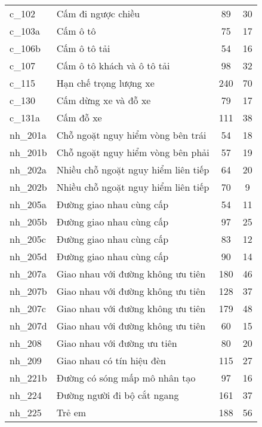 \documentclass[../thesis.tex]{subfiles}
\begin{document}
\begin{table}[H]
\begin{longtable}{| l | l | c | c |}
	\hline
	\thead{Nhãn} & \thead{Mô tả} & \thead{Training set} & \thead{Test set}\\
	\hline
	c\_102 & Cấm đi ngược chiều & 89 & 30\\
	\hline
	c\_103a & Cấm ô tô & 75 & 17\\
	\hline
	c\_106b & Cấm ô tô tải & 54 & 16\\
	\hline
	c\_107 & Cấm ô tô  khách và ô tô  tải & 98 & 32\\
	\hline
	c\_115 & Hạn chế trọng lượng xe & 240 & 70\\
	\hline
	c\_130 & Cấm dừng xe và đỗ xe & 79 & 17\\
	\hline
	c\_131a & Cấm đỗ xe & 111 & 38\\
	\hline
	nh\_201a & Chỗ ngoặt nguy hiểm vòng bên trái & 54 & 18\\
	\hline
	nh\_201b & Chỗ ngoặt nguy hiểm vòng bên phải & 57 & 19\\
	\hline
	nh\_202a & Nhiều chỗ ngoặt nguy hiểm liên tiếp & 64 & 20\\
	\hline
	nh\_202b & Nhiều chỗ ngoặt nguy hiểm liên tiếp & 70 & 9\\
	\hline
	nh\_205a & Đường giao nhau cùng cấp & 54 & 11\\
	\hline
	nh\_205b & Đường giao nhau cùng cấp & 97 & 25\\
	\hline
	nh\_205c & Đường giao nhau cùng cấp & 83 & 12\\
	\hline
	nh\_205d & Đường giao nhau cùng cấp & 90 & 14\\
	\hline
	nh\_207a & Giao nhau với đường không ưu tiên & 180 & 46\\
	\hline
	nh\_207b & Giao nhau với đường không ưu tiên & 128 & 37\\
	\hline
	nh\_207c & Giao nhau với đường không ưu tiên & 179 & 48\\
	\hline
	nh\_207d & Giao nhau với đường không ưu tiên & 60 & 15\\
	\hline
	nh\_208 & Giao nhau với đường ưu tiên & 80 & 20\\
	\hline
	nh\_209 & Giao nhau có tín hiệu đèn & 115 & 27\\
	\hline
	nh\_221b & Đường có sóng mấp mô nhân tạo & 97 & 16\\
	\hline
	nh\_224 & Đường người đi bộ cắt ngang & 161 & 37\\
	\hline
	nh\_225 & Trẻ em & 188 & 56\\
	\hline

\end{longtable}
\end{table}
\end{document}
